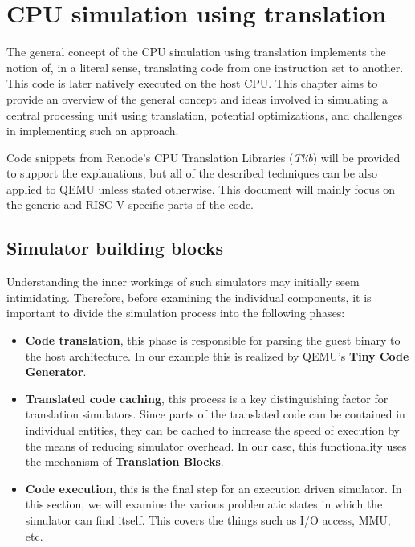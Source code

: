 
\chapter{CPU simulation using translation}

The general concept of the CPU simulation using translation implements the notion of, in a literal sense, translating
code from one instruction set to another. This code is later natively executed on the host CPU. This chapter aims to
provide an overview of the general concept and ideas involved in simulating a central processing unit using translation,
potential optimizations, and challenges in implementing such an approach.

Code snippets from Renode's CPU Translation Libraries (\textit{Tlib})  will be provided to support the explanations, but
all of the described techniques can be also applied to QEMU unless stated otherwise. This document will mainly focus on
the generic and RISC-V specific parts of the code.

\section*{Simulator building blocks}

Understanding the inner workings of such simulators may initially seem intimidating. Therefore, before examining the
individual components, it is important to divide the simulation process into the following phases:

\begin{itemize}
    \item{\textbf{Code translation}, this phase is responsible for parsing the guest binary to the host architecture.
    In our example this is realized 
    by QEMU's \textbf{Tiny Code Generator}.}
    \item{\textbf{Translated code caching}, this process is a key distinguishing factor for translation simulators.
    Since parts of the translated code can be 
    contained in individual entities,
    they can be cached to increase the speed
    of execution by the means of reducing simulator overhead. In our case, this functionality uses the mechanism of
    \textbf{Translation Blocks}.}
    \item{\textbf{Code execution}, this is the final step for an execution driven simulator. In this section, we will
    examine the various problematic states in which the simulator can find itself. This covers the things such as
    I/O access, MMU, etc.}
\end{itemize}

